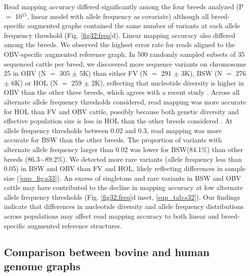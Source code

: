 \documentclass[../main.tex]{subfiles}
\begin{document}
Read mapping accuracy differed significantly among the four breeds analyzed (P $=$ 10$^{15}$, linear model with allele frequency as covariate) although all breed-specific augmented graphs contained the same number of variants at each allele frequency threshold (Fig. \ref{fig32:freq}d). Linear mapping accuracy also differed among the breeds. We observed the highest error rate for reads aligned to the OBV-specific augmented reference graph. In 500 randomly sampled subsets of 35 sequenced cattle per breed, we discovered more sequence variants on chromosome 25 in OBV (N $=$ 305 $\pm$ 5K) than either FV (N $=$ 291 $\pm$ 3K), BSW (N $=$ 276 $\pm$ 6K) or HOL (N $=$ 259 $\pm$ 2K), reflecting that nucleotide diversity is higher in OBV than the other three breeds, which agrees with a recent study \citep{bhati2020assessing}. Across all alternate allele frequency thresholds considered, read mapping was more accurate for HOL than FV and OBV cattle, possibly because both genetic diversity and effective population size is less in HOL than the other breeds considered \citep{signer2017population}. At allele frequency thresholds between 0.02 and 0.3, read mapping was more accurate for BSW than the other breeds. The proportion of variants with alternate allele frequency larger than 0.02 was lower for BSW(84.1\%) than other breeds (86.3$-$89.2\%). We detected more rare variants (allele frequency less than 0.05) in BSW and OBV than FV and HOL, likely reflecting differences in sample size (\ref{sup_fig:s33}). An excess of singletons and rare variants in BSW and OBV cattle may have contributed to the decline in mapping accuracy at low alternate allele frequency thresholds (Fig. \ref{fig32:freq}d inset, \ref{sup_tab:s32}). Our findings indicate that differences in nucleotide diversity and allele frequency distributions across populations may affect read mapping accuracy to both linear and breed-specific augmented reference structures.

\subsection*{Comparison between bovine and human genome graphs}
\end{document}
